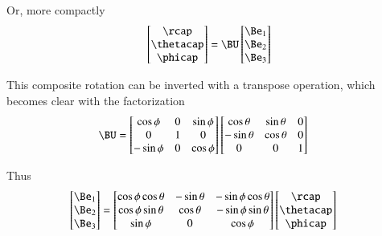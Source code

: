 Or, more compactly
\begin{align*}
\begin{bmatrix}
\rcap \\
\thetacap \\
\phicap \\
\end{bmatrix}
=
\BU
\begin{bmatrix}
\Be_1 \\
\Be_2 \\
\Be_3 \\
\end{bmatrix}
\end{align*}

This composite rotation can be inverted with a transpose operation, which 
becomes clear with the factorization
\begin{align*}
\BU
&=
\begin{bmatrix}
\cos\phi & 0 & \sin\phi \\
0 & 1 & 0 \\
-\sin\phi & 0 & \cos\phi
\end{bmatrix}
\begin{bmatrix}
\cos\theta & \sin\theta & 0 \\
-\sin\theta & \cos\theta & 0 \\
0 & 0 & 1 \\
\end{bmatrix}
\end{align*}

Thus
\begin{align*}
\begin{bmatrix}
\Be_1 \\
\Be_2 \\
\Be_3 \\
\end{bmatrix}
&=
%
\begin{bmatrix}
\cos\phi \cos\theta & - \sin\theta & - \sin\phi \cos\theta \\
\cos\phi \sin\theta & \cos\theta & - \sin\phi \sin\theta  \\
\sin\phi & 0 & \cos\phi \\
\end{bmatrix}
\begin{bmatrix}
\rcap \\
\thetacap \\
\phicap \\
\end{bmatrix}
\end{align*}

